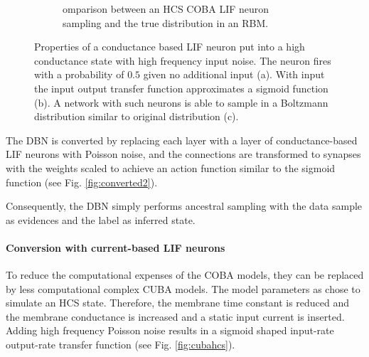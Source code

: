 \begin{figure}
\begin{subfigure}[t]{.5\textwidth}
  		\caption{omparison between an HCS COBA LIF neuron sampling and the true distribution in an RBM.}
  		\label{fig:cobahcs3}
	\end{subfigure}
	\caption[Properties of a conductance based LIF neuron in a high conductance state.]{Properties of a conductance based LIF neuron put into a high conductance state with high frequency input noise. The neuron fires with a probability of $0.5$ given no additional input (a). With input the input output transfer function approximates a sigmoid function (b). A network with such neurons is able to sample in a Boltzmann distribution similar to original distribution (c). }
	\label{fig:cobahcs}

\end{figure}
  
The DBN is converted by replacing each layer with a layer of conductance-based LIF neurons with Poisson noise, and the connections are transformed to synapses with the weights scaled to achieve an action function similar to the sigmoid function (see Fig. \ref{fig:converted2}).

Consequently, the DBN simply performs ancestral sampling with the data sample as evidences and the label as inferred state.   


\paragraph{Conversion with current-based LIF neurons} \label{c:convascuba}

To reduce the computational expenses of the COBA models, they can be replaced by less computational complex CUBA models.
The model parameters as chose to simulate an HCS state.
Therefore, the membrane time constant is reduced and the membrane conductance is increased and a static input current is inserted.  
Adding high frequency Poisson noise results in a sigmoid shaped input-rate output-rate transfer function (see Fig. \ref{fig:cubahcs}).

